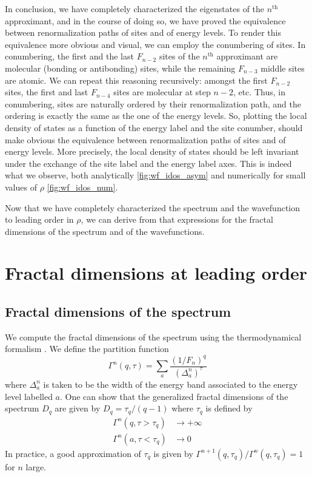 \documentclass[aps,prl,preprint]{revtex4-1}
\begin{document}
In conclusion, we have completely characterized the eigenstates of the $n^\text{th}$ approximant, and in the course of doing so, we have proved the equivalence between renormalization paths of sites and of energy levels.
To render this equivalence more obvious and visual, we can employ the conumbering of sites.
In conumbering, the first and the last $F_{n-2}$ sites of the $n^\text{th}$ approximant are molecular (bonding or antibonding) sites, while the remaining $F_{n-3}$ middle sites are atomic. 
We can repeat this reasoning recursively: amongst the first $F_{n-2}$ sites, the first and last $F_{n-4}$ sites are molecular at step $n-2$, etc. 
Thus, in conumbering, sites are naturally ordered by their renormalization path, and the ordering is exactly the same as the one of the energy levels.
So, plotting the local density of states as a function of the energy label and the site conumber, should make obvious the equivalence between renormalization paths of sites and of energy levels.
More precisely, the local density of states should be left invariant under the exchange of the site label and the energy label axes. This is indeed what we observe, both analytically \eqref{fig:wf_idos_asym} and numerically for small values of $\rho$ \eqref{fig:wf_idos_num}.

Now that we have completely characterized the spectrum and the wavefunction to leading order in $\rho$, we can derive from that expressions for the fractal dimensions of the spectrum and of the wavefunctions.

\section{Fractal dimensions at leading order}

\subsection{Fractal dimensions of the spectrum}

We compute the fractal dimensions of the spectrum using the thermodynamical formalism \cite{Halsey1986}. We define the partition function
\begin{equation}
	\Gamma^n(q,\tau) = \sum_{a} \frac{\left( 1/F_n \right)^q}{(\Delta_a^n)^\tau}
\end{equation}
where $\Delta_a^n$ is taken to be the width of the energy band associated to the energy level labelled $a$.
One can show \cite{Halsey1986} that the generalized fractal dimensions of the spectrum $D_q$ are given by $D_q = \tau_q/(q-1)$ where $\tau_q$ is defined by
\begin{align}
	\Gamma^n(q,\tau > \tau_q) &\rightarrow +\infty \\
	\Gamma^n(a,\tau < \tau_q) &\rightarrow 0
\end{align}
In practice, a good approximation of $\tau_q$ is given by $\Gamma^{n+1}(q,\tau_q)/\Gamma^n(q,\tau_q) = 1$ for $n$ large.
\end{document}
